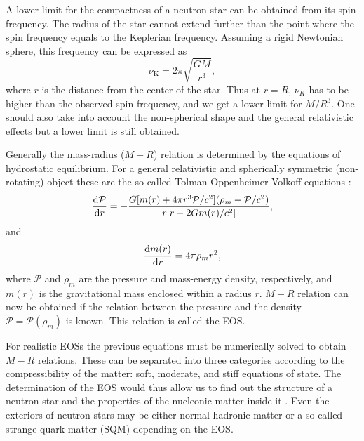 \documentclass{wihuri}
\def\be{\begin{equation}}
\def\ee{\end{equation}}
\def\d{{\rm d}}
\begin{document}
A lower limit for the compactness of a neutron star can be obtained from its spin frequency. The radius of the star cannot extend further than the point where the spin frequency equals to the Keplerian frequency. Assuming a rigid Newtonian sphere, this frequency can be expressed as
\be \label{eq:keplerian}
\nu_{\mathrm{K}} = 2 \pi \sqrt{\frac{GM}{r^{3}}},
\ee 
where $r$ is the distance from the center of the star. Thus at $r=R$, $\nu_{K}$ has to be higher than the observed spin frequency, and we get a lower limit for $M/R^{3}$. One should also take into account the non-spherical shape and the general relativistic effects but a lower limit is still obtained.








Generally the mass-radius ($M-R$) relation is determined by the equations of hydrostatic equilibrium. For a general relativistic and spherically symmetric (non-rotating) object %
these are the so-called Tolman-Oppenheimer-Volkoff equations %
\cite{tolman}\cite{oppenheimer}:
\be
 \frac{\d \mathcal{P}}{\d r} = -\frac{G[m(r)+4 \pi r^{3}\mathcal{P}/c^{2}](\rho_{m} + \mathcal{P}/c^{2})}{r[r-2Gm(r)/c^{2}]},
\ee 
and
\be
 \frac{\d m(r)}{\d r } = 4 \pi \rho_{m} r^{2},
\ee
where $\mathcal{P}$ and $\rho_{m}$ are the pressure and mass-energy density, respectively, and $m(r)$ is the gravitational mass enclosed within a radius $r$. $M-R$ relation can now be obtained if the relation between the pressure and the density $\mathcal{P}=\mathcal{P}(\rho_{m})$ is known. This relation is called the EOS. 


For realistic EOSs the previous equations must be numerically solved to obtain $M-R$ relations. These can be separated into three categories according to the compressibility of the matter: soft, moderate, and stiff equations of state. The determination of the EOS would thus allow us to find out the structure of a neutron star and the properties of the nucleonic matter inside it \cite{akmal}. Even the exteriors of neutron stars may be either normal hadronic matter or a so-called strange quark matter (SQM) depending on the EOS.  
\end{document}
